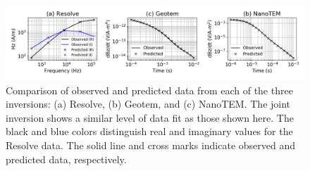 \begin{figure}
    \begin{center}
    \includegraphics[width=\columnwidth]{figures/obs-vs-pred.png}
    \end{center}
\caption{
    Comparison of observed and predicted data from each of the three inversions: (a) Resolve, (b) Geotem, and (c) NanoTEM. The joint inversion shows a similar level of data fit as those shown here. The black and blue colors distinguish real and imaginary values for the Resolve data. The solid line and cross marks indicate observed and predicted data, respectively.
}
\label{fig:obs-vs-pred}
\end{figure}


